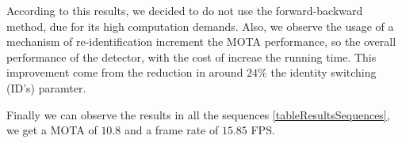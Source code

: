 \documentclass[12pt, a4paper, titlepage,twoside,openright]{article}
\begin{document}
\begin{table}[H]
\centering

\caption{Results algorithm global.}
\label{tableResults}
\end{table}

According to this results, we decided to do not use the forward-backward method, due for its high computation demands. Also, we observe the usage of a mechanism of re-identification increment the MOTA performance, so the overall performance of the detector, with the cost of increae the running time. This improvement come from the reduction in around $24 \%$ the identity switching (ID's) paramter.

Finally we can observe the results in all the sequences \ref{tableResultsSequences}, we get a MOTA of $10.8$ and a frame rate of $15.85$ FPS. 
\end{document}
